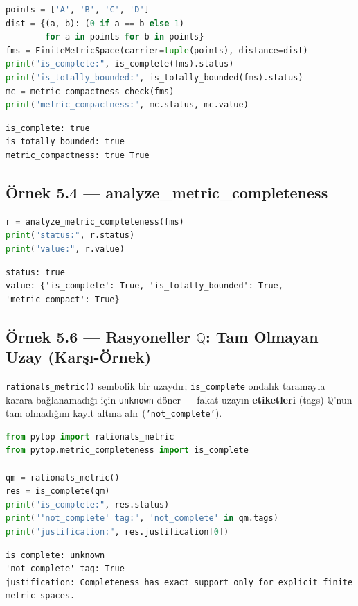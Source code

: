 \begin{lstlisting}[language=Python]
points = ['A', 'B', 'C', 'D']
dist = {(a, b): (0 if a == b else 1)
        for a in points for b in points}
fms = FiniteMetricSpace(carrier=tuple(points), distance=dist)
print("is_complete:", is_complete(fms).status)
print("is_totally_bounded:", is_totally_bounded(fms).status)
mc = metric_compactness_check(fms)
print("metric_compactness:", mc.status, mc.value)
\end{lstlisting}

\begin{verbatim}
is_complete: true
is_totally_bounded: true
metric_compactness: true True
\end{verbatim}

\subsection*{Örnek 5.4 — analyze\_metric\_completeness}

\begin{lstlisting}[language=Python]
r = analyze_metric_completeness(fms)
print("status:", r.status)
print("value:", r.value)
\end{lstlisting}

\begin{verbatim}
status: true
value: {'is_complete': True, 'is_totally_bounded': True, 'metric_compact': True}
\end{verbatim}

\subsection*{Örnek 5.6 — Rasyoneller $\mathbb{Q}$: Tam Olmayan Uzay (Karşı-Örnek)}

\texttt{rationals\_metric()} sembolik bir uzaydır; \texttt{is\_complete} ondalık
taramayla karara bağlanamadığı için \texttt{unknown} döner --- fakat uzayın
\textbf{etiketleri} (tags) $\mathbb{Q}$'nun tam olmadığını kayıt altına alır
(\texttt{'not\_complete'}).

\begin{lstlisting}[language=Python]
from pytop import rationals_metric
from pytop.metric_completeness import is_complete

qm = rationals_metric()
res = is_complete(qm)
print("is_complete:", res.status)
print("'not_complete' tag:", 'not_complete' in qm.tags)
print("justification:", res.justification[0])
\end{lstlisting}

\begin{verbatim}
is_complete: unknown
'not_complete' tag: True
justification: Completeness has exact support only for explicit finite metric spaces.
\end{verbatim}

